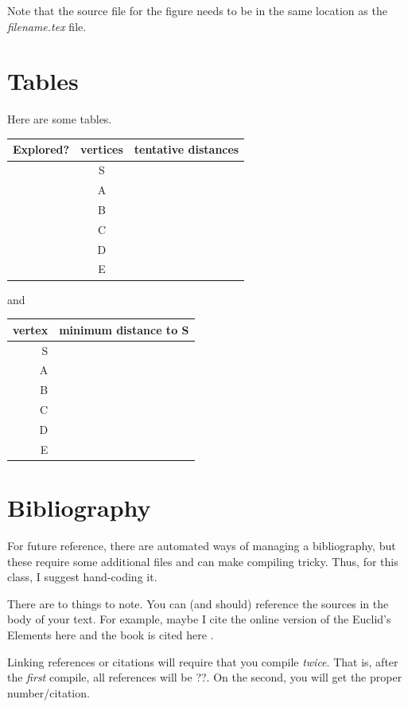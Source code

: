 \documentclass{article}
\begin{document}
Note that the source file for the figure needs to be in the same location as the \textit{filename.tex} file.



\section{Tables}\label{tables}

Here are some tables. 


\begin{tabular}{ c | c | p{1.5in}}
Explored? & vertices & tentative distances\\ \hline
&S& \\[12pt] \hline
&A& \\[12pt]\hline
&B& \\[12pt]\hline
&C& \\[12pt]\hline
&D& \\[12pt]\hline
&E& \\[12pt]\hline
 \end{tabular}
 \quad and \quad
 \begin{tabular}{ r | p{.8in} }
 vertex & minimum distance to S\\ \hline
S& \\[12pt] \hline
A& \\[12pt]\hline
B& \\[12pt]\hline
C& \\[12pt]\hline
D& \\[12pt]\hline
E& \\[12pt]\hline \end{tabular}
 
\vfill



\section{Bibliography}\label{bib}



For future reference, there are automated ways of managing a bibliography, but these require some additional files and can make compiling tricky. Thus, for this class, I suggest hand-coding it. 

There are to things to note. You can (and should) reference the sources in the body of your text. For example, maybe I cite the online version of the Euclid's Elements here \cite{elements} and the book is cited here \cite{our_text}.

Linking references or citations will require that you compile \emph{twice}. That is, after the \emph{first} compile, all references will be ??. On the second, you will get the proper number/citation.
\end{document}
